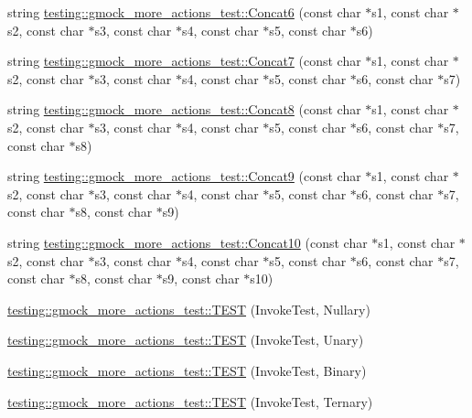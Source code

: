 \begin{DoxyCompactItemize}
string \hyperlink{namespacetesting_1_1gmock__more__actions__test_a4de188277a85d007de0aa6e8dc364b75}{testing\+::gmock\+\_\+more\+\_\+actions\+\_\+test\+::\+Concat6} (const char $\ast$s1, const char $\ast$s2, const char $\ast$s3, const char $\ast$s4, const char $\ast$s5, const char $\ast$s6)
\item 
string \hyperlink{namespacetesting_1_1gmock__more__actions__test_a5628f71ebb5ae61a6e56396145a76da4}{testing\+::gmock\+\_\+more\+\_\+actions\+\_\+test\+::\+Concat7} (const char $\ast$s1, const char $\ast$s2, const char $\ast$s3, const char $\ast$s4, const char $\ast$s5, const char $\ast$s6, const char $\ast$s7)
\item 
string \hyperlink{namespacetesting_1_1gmock__more__actions__test_a122e4affe78745eef3dd748e88bd248c}{testing\+::gmock\+\_\+more\+\_\+actions\+\_\+test\+::\+Concat8} (const char $\ast$s1, const char $\ast$s2, const char $\ast$s3, const char $\ast$s4, const char $\ast$s5, const char $\ast$s6, const char $\ast$s7, const char $\ast$s8)
\item 
string \hyperlink{namespacetesting_1_1gmock__more__actions__test_a9f8c8c01bc080a04d798060dad757cf9}{testing\+::gmock\+\_\+more\+\_\+actions\+\_\+test\+::\+Concat9} (const char $\ast$s1, const char $\ast$s2, const char $\ast$s3, const char $\ast$s4, const char $\ast$s5, const char $\ast$s6, const char $\ast$s7, const char $\ast$s8, const char $\ast$s9)
\item 
string \hyperlink{namespacetesting_1_1gmock__more__actions__test_aba6aadf0de090a08bf9e467cdc09ffd8}{testing\+::gmock\+\_\+more\+\_\+actions\+\_\+test\+::\+Concat10} (const char $\ast$s1, const char $\ast$s2, const char $\ast$s3, const char $\ast$s4, const char $\ast$s5, const char $\ast$s6, const char $\ast$s7, const char $\ast$s8, const char $\ast$s9, const char $\ast$s10)
\item 
\hyperlink{namespacetesting_1_1gmock__more__actions__test_a9c5fbd26c6cc6ed31aed5bafb2fa8e5c}{testing\+::gmock\+\_\+more\+\_\+actions\+\_\+test\+::\+T\+E\+ST} (Invoke\+Test, Nullary)
\item 
\hyperlink{namespacetesting_1_1gmock__more__actions__test_a28b57a9f9d38574b7c033988ad528ddd}{testing\+::gmock\+\_\+more\+\_\+actions\+\_\+test\+::\+T\+E\+ST} (Invoke\+Test, Unary)
\item 
\hyperlink{namespacetesting_1_1gmock__more__actions__test_a906bd5cc7aa38e2cc861a9732481fce7}{testing\+::gmock\+\_\+more\+\_\+actions\+\_\+test\+::\+T\+E\+ST} (Invoke\+Test, Binary)
\item 
\hyperlink{namespacetesting_1_1gmock__more__actions__test_a424fb6113c6c1ab2157edf854a4ae9fe}{testing\+::gmock\+\_\+more\+\_\+actions\+\_\+test\+::\+T\+E\+ST} (Invoke\+Test, Ternary)

\end{DoxyCompactItemize}
